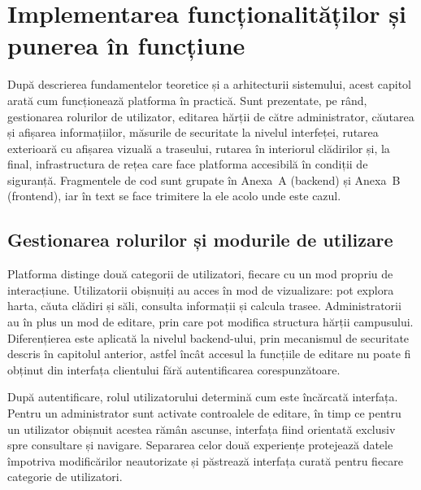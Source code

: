 
\chapter{Implementarea funcționalităților și punerea în funcțiune}
\label{cap:implementare}

După descrierea fundamentelor teoretice și a arhitecturii sistemului, acest
capitol arată cum funcționează platforma în practică. Sunt prezentate, pe rând,
gestionarea rolurilor de utilizator, editarea hărții de către administrator,
căutarea și afișarea informațiilor, măsurile de securitate la nivelul
interfeței, rutarea exterioară cu afișarea vizuală a traseului, rutarea în
interiorul clădirilor și, la final, infrastructura de rețea care face platforma
accesibilă în condiții de siguranță. Fragmentele de cod sunt grupate în Anexa~A
(backend) și Anexa~B (frontend), iar în text se face trimitere la ele acolo
unde este cazul.

\section{Gestionarea rolurilor și modurile de utilizare}
\label{sec:roluri-impl}

Platforma distinge două categorii de utilizatori, fiecare cu un mod propriu de
interacțiune. Utilizatorii obișnuiți au acces în mod de vizualizare: pot
explora harta, căuta clădiri și săli, consulta informații și calcula trasee.
Administratorii au în plus un mod de editare, prin care pot modifica structura
hărții campusului. Diferențierea este aplicată la nivelul backend-ului, prin
mecanismul de securitate descris în capitolul anterior, astfel încât accesul la
funcțiile de editare nu poate fi obținut din interfața clientului fără
autentificarea corespunzătoare.

După autentificare, rolul utilizatorului determină cum este încărcată
interfața. Pentru un administrator sunt activate controalele de editare, în
timp ce pentru un utilizator obișnuit acestea rămân ascunse, interfața fiind
orientată exclusiv spre consultare și navigare. Separarea celor două
experiențe protejează datele împotriva modificărilor neautorizate și păstrează
interfața curată pentru fiecare categorie de utilizatori.


